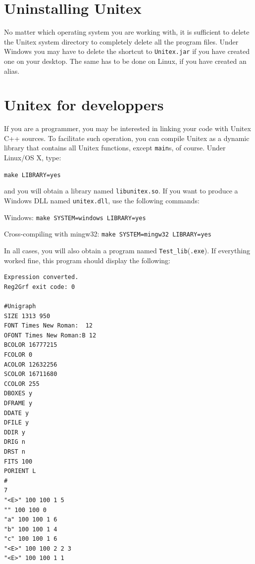 \section{Uninstalling Unitex}
No matter which operating system you are working with, it is sufficient to delete 
the Unitex system directory to completely delete all the program files. Under
Windows you may have to delete the shortcut to \verb+Unitex.jar+  
if you have created one on your desktop. The same has to be done on Linux, if you have 
created an alias.


\section{Unitex for developpers}
\label{section-unitex-developpers}
If you are a programmer, you may be interested in linking your code with Unitex
C++ sources. To facilitate such operation, you can compile Unitex as a
dynamic library that contains all Unitex functions, except \verb+main+s, of
course. Under Linux/OS X, type:

\bigskip
\verb+make LIBRARY=yes+

\bigskip
\noindent and you will obtain a library named \verb+libunitex.so+. If you want
to produce a Windows DLL named \verb+unitex.dll+, use the following commands:

\bigskip
Windows: \verb+make SYSTEM=windows LIBRARY=yes+

Cross-compiling with mingw32: \verb+make SYSTEM=mingw32 LIBRARY=yes+

\bigskip
\noindent In all cases, you will also obtain a program named
\verb+Test_lib+(\verb+.exe+). If everything worked fine, this program should 
display the following:

\begin{verbatim}
Expression converted.
Reg2Grf exit code: 0

#Unigraph
SIZE 1313 950
FONT Times New Roman:  12
OFONT Times New Roman:B 12
BCOLOR 16777215
FCOLOR 0
ACOLOR 12632256
SCOLOR 16711680
CCOLOR 255
DBOXES y
DFRAME y
DDATE y
DFILE y
DDIR y
DRIG n
DRST n
FITS 100
PORIENT L
#
7
"<E>" 100 100 1 5
"" 100 100 0
"a" 100 100 1 6
"b" 100 100 1 4
"c" 100 100 1 6
"<E>" 100 100 2 2 3
"<E>" 100 100 1 1
\end{verbatim}
